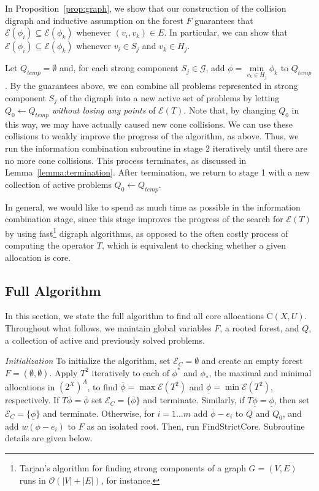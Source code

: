 \documentclass[11pt,reqno]{amsart}
\theoremstyle{definition}
\numberwithin{equation}{section}
\newcommand{\ol}{\overline}
\newcommand{\ul}{\underline}
\newcommand{\pre}{\phi}
\newcommand{\prealloc}{(2^X)^A}
\newcommand{\sub}{\subseteq}
\newcommand{\strcore}{\mathrm{C}(X,U)}
\newcommand{\fix}{\mathcal{E}}
\newcommand{\toppre}{\ol{\pre}}
\newcommand{\bopre}{\ul{\pre}}
\newcommand{\strongc}{\mathcal{G}}
\newcommand{\strongcomp}{S}
\newcommand{\acto}{Q_0}
\newcommand{\act}{Q}
\newcommand{\actt}{Q_{temp}}
\newcommand{\reach}{H}
\newcommand{\forest}{F}
\newcommand{\fixfind}{\mathcal{E}_C}
\begin{document}
In Proposition~\ref{prop:graph}, we show that our construction of the collision digraph and inductive assumption on the forest $\forest$ guarantees that $\fix(\pre_i) \sub \fix(\pre_k)$ whenever $(v_i,v_k) \in E$.
In particular, we can show that $\fix(\pre_i) \sub \fix(\pre_k)$ whenever $v_i \in \strongcomp_j$ and $v_k \in \reach_j$.

Let $\actt = \emptyset$ and, for each strong component $\strongcomp_j \in \strongc$, add $\pre = \min\limits_{v_k \in \reach_j} \pre_k$ to $\actt$.
By the guarantees above, we can combine all problems represented in strong component $\strongcomp_j$ of the digraph into a new active set of problems by letting $\acto \leftarrow \actt$ \emph{without losing any points} of $\fix(T)$.
Note that, by changing $\acto$ in this way, we may have actually caused new cone collisions.
We can use these collisions to weakly improve the progress of the algorithm, as above.
Thus, we run the information combination subroutine in stage 2 iteratively until there are no more cone collisions.
This process terminates, as discussed in Lemma~\ref{lemma:termination}.
After termination, we return to stage 1 with a new collection of active problems $\acto \leftarrow \actt$.

In general, we would like to spend as much time as possible in the information combination stage, since this stage improves the progress of the search for $\fix(T)$ by using fast\footnote{Tarjan's algorithm for finding strong components of a graph $G = (V,E)$ runs in $\mathcal{O}(|V| + |E|)$, for instance.} digraph algorithms, as opposed to the often costly process of computing the operator $T$, which is equivalent to checking whether a given allocation is core.  

\subsection{Full Algorithm} \label{fullalgo}
In this section, we state the full algorithm to find all core allocations $\strcore$. 
Throughout what follows, we maintain global variables $\forest$, a rooted forest, and $\act$, a collection of active and previously solved problems.

\emph{Initialization} To initialize the algorithm, set $\fixfind = \emptyset$ and create an empty forest $F = (\emptyset,\emptyset)$. 
Apply $T^2$ iteratively to each of $\pre^*$ and $\pre_*$, the maximal and minimal allocations in $\prealloc$, to find $\toppre = \max \fix(T^2)$ and $\ul{\pre} = \min \fix(T^2)$, respectively.
If $T\toppre = \toppre$ set $\fixfind = \{\toppre\}$ and terminate.
Similarly, if $T\bopre = \bopre$, then set $\fixfind = \{\bopre\}$ and terminate. 
Otherwise, for $i = 1 \hdots m$ add $\toppre - e_i$ to $\act$ and $\acto$, and add $w(\pre - e_i)$ to $F$ as an isolated root. Then, run FindStrictCore. 
Subroutine details are given below.
\end{document}
